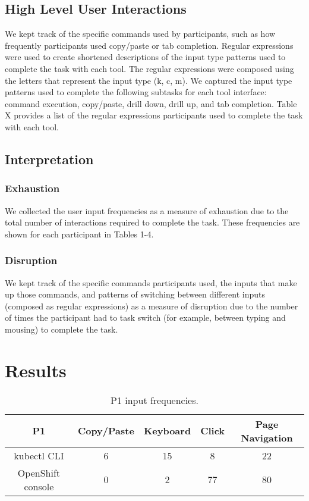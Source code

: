 \documentclass[11pt, oneside]{article}   	%
\begin{document}
\subsection{High Level User Interactions}
We kept track of the specific commands used by participants, such as how frequently participants used copy/paste or tab completion. Regular expressions were used to create shortened descriptions of the input type patterns used to complete the task with each tool. The regular expressions were composed using the letters that represent the input type (k, c, m). We captured the input type patterns used to complete the following subtasks for each tool interface: command execution, copy/paste, drill down, drill up, and tab completion. Table X provides a list of the regular expressions participants used to complete the task with each tool. 

\subsection{Interpretation}
\subsubsection{Exhaustion}
We collected the user input frequencies as a measure of exhaustion due to the total number of interactions required to complete the task. These frequencies are shown for each participant in Tables 1-4.
\subsubsection{Disruption}
We kept track of the specific commands participants used, the inputs that make up those commands, and patterns of switching between different inputs (composed as regular expressions) as a measure of disruption due to the number of times the participant had to task switch (for example, between typing and mousing) to complete the task. 

\section{Results}

\begin{table}
 \centering
  \begin{tabular}{ | c | c | c | c | c | }
  \hline
  P1 & Copy/Paste & Keyboard & Click & Page Navigation \\ 
  \hline
  kubectl CLI & 6 & 15 & 8 & 22 \\ 
  \hline
  OpenShift console & 0 & 2 & 77 & 80 \\ 
  \hline
  \end{tabular}
 \caption{P1 input frequencies.}
\end{table}
\end{document}
